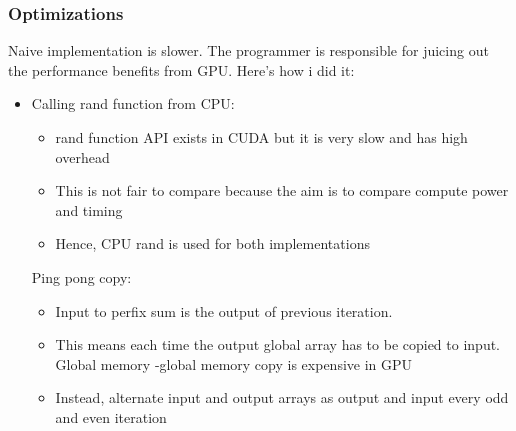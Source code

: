 \documentclass[mathserif]{beamer}
\begin{document}
\begin{frame}                                                                                                                                                                          
\frametitle{Optimizations}
Naive implementation is slower. The programmer is responsible for juicing out the performance benefits from GPU. Here's how i did it:
\begin{itemize}
\item Calling rand function from CPU: 
\begin{itemize}
\item rand function API exists in CUDA but it is very slow and has high overhead
\item This is not fair to compare because the aim is to compare compute power and timing
\item Hence, CPU rand is used for both implementations 
\end{itemize}
Ping pong copy: 
\begin{itemize}
\item Input to perfix sum is the output of previous iteration.  
\item This means each time the output global array has to be copied to input. Global memory -global memory copy is expensive in GPU 
\item Instead, alternate input and output arrays as output and input every odd and even iteration 
\end{itemize}
\end{itemize}
\end{frame}              
\end{document}
